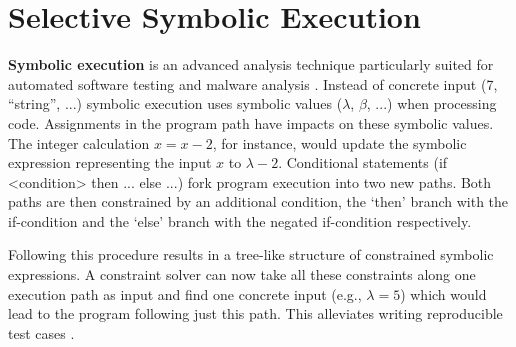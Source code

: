 \section{Selective Symbolic Execution}\label{sec:s2e}

\textbf{Symbolic execution} is an advanced analysis technique particularly suited for automated software testing  and malware analysis .
Instead of concrete input (7, ``string'', ...) symbolic execution uses symbolic values ($\lambda$, $\beta$, ...) when processing code.
Assignments in the program path have impacts on these symbolic values.
The integer calculation $x = x - 2$, for instance, would update the symbolic expression representing the input $x$ to $\lambda - 2$.
Conditional statements (if <condition> then ... else ...) fork program execution into two new paths.
Both paths are then constrained by an additional condition, the `then' branch with the if-condition and the `else' branch with the negated if-condition respectively.

Following this procedure results in a tree-like structure of constrained symbolic expressions.
A constraint solver can now take all these constraints along one execution path as input and find one concrete input (e.g., $\lambda = 5$) which would lead to the program following just this path.
This alleviates writing reproducible test cases .




\iffalse
§2	Selective Symbolic Execution
		> Theorie-Teil
		> Was ist Symbolic Execution?
		> Was kann Selective Symbolic Execution besser?
			(Concrete -> symbolic transition usw.)
		> Konsistenzmodelle (wird hier evtl. schwierig, das richtige Maß 
			zu finden, um die Sache auf wenig Platz zu verstehen)
\fi
